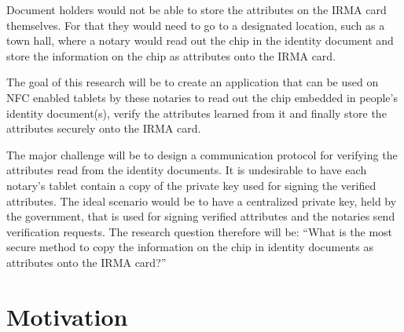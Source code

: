 \documentclass[a4paper, oneside]{scrartcl}
\begin{document}
Document holders would not be able to store the attributes on the IRMA card themselves. For that they would need to go to a designated location, such as a town hall, where a notary would read out the chip in the identity document and store the information on the chip as attributes onto the IRMA card.

The goal of this research will be to create an application that can be used on NFC enabled tablets by these notaries to read out the chip embedded in people's identity document(s), verify the attributes learned from it and finally store the attributes securely onto the IRMA card.

The major challenge will be to design a communication protocol for verifying the attributes read from the identity documents. It is undesirable to have each notary's tablet contain a copy of the private key used for signing the verified attributes. The ideal scenario would be to have a centralized private key, held by the government, that is used for signing verified attributes and the notaries send verification requests. The research question therefore will be: ``What is the most secure method to copy the information on the chip in identity documents as attributes onto the IRMA card?''

\section{Motivation}

\end{document}
